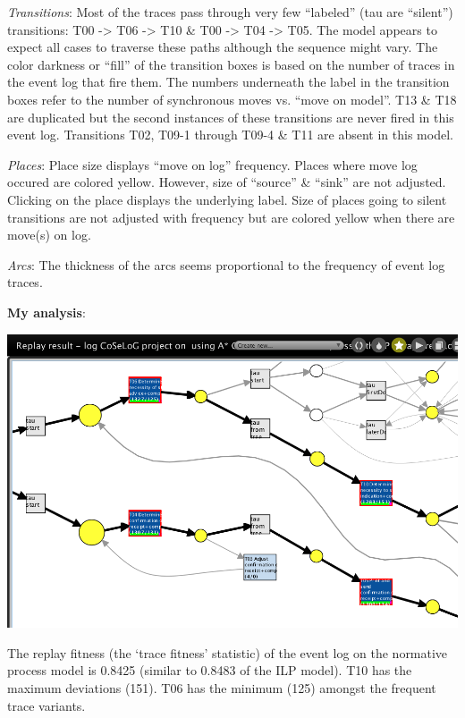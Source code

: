 \documentclass[]{article}
\begin{document}
\emph{Transitions}: Most of the traces pass through very few ``labeled''
(tau are ``silent'') transitions: T00 -\textgreater{} T06
-\textgreater{} T10 \& T00 -\textgreater{} T04 -\textgreater{} T05. The
model appears to expect all cases to traverse these paths although the
sequence might vary. The color darkness or ``fill'' of the transition
boxes is based on the number of traces in the event log that fire them.
The numbers underneath the label in the transition boxes refer to the
number of synchronous moves vs. ``move on model''. T13 \& T18 are
duplicated but the second instances of these transitions are never fired
in this event log. Transitions T02, T09-1 through T09-4 \& T11 are
absent in this model.

\emph{Places}: Place size displays ``move on log'' frequency. Places
where move log occured are colored yellow. However, size of ``source''
\& ``sink'' are not adjusted. Clicking on the place displays the
underlying label. Size of places going to silent transitions are not
adjusted with frequency but are colored yellow when there are move(s) on
log.

\emph{Arcs}: The thickness of the arcs seems proportional to the
frequency of event log traces.

\textbf{My analysis}:

\includegraphics{CoSeLoG_Step_06_PetriNet_Normative_Conformance_Zoom.png}

The replay fitness (the `trace fitness' statistic) of the event log on
the normative process model is 0.8425 (similar to 0.8483 of the ILP
model). T10 has the maximum deviations (151). T06 has the minimum (125)
amongst the frequent trace variants.
\end{document}

